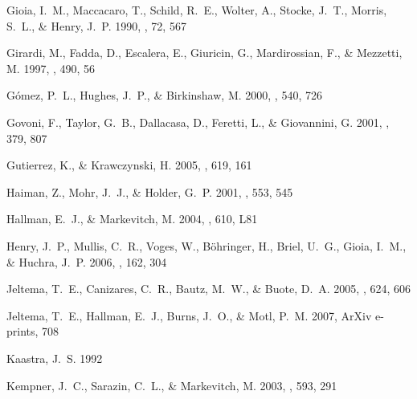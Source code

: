 \documentclass[12pt,preprint]{aastex}
\begin{document}
\begin{thebibliography}{}
{Gioia}, I.~M., {Maccacaro}, T., {Schild}, R.~E., {Wolter}, A., {Stocke},
  J.~T., {Morris}, S.~L., \& {Henry}, J.~P. 1990, \apjs, 72, 567

{Girardi}, M., {Fadda}, D., {Escalera}, E., {Giuricin}, G., {Mardirossian}, F.,
  \& {Mezzetti}, M. 1997, \apj, 490, 56

{G{\'o}mez}, P.~L., {Hughes}, J.~P., \& {Birkinshaw}, M. 2000, \apj, 540, 726

{Govoni}, F., {Taylor}, G.~B., {Dallacasa}, D., {Feretti}, L., \& {Giovannini},
  G. 2001, \aap, 379, 807

{Gutierrez}, K., \& {Krawczynski}, H. 2005, \apj, 619, 161

{Haiman}, Z., {Mohr}, J.~J., \& {Holder}, G.~P. 2001, \apj, 553, 545

{Hallman}, E.~J., \& {Markevitch}, M. 2004, \apjl, 610, L81

{Henry}, J.~P., {Mullis}, C.~R., {Voges}, W., {B{\"o}hringer}, H., {Briel},
  U.~G., {Gioia}, I.~M., \& {Huchra}, J.~P. 2006, \apjs, 162, 304

{Jeltema}, T.~E., {Canizares}, C.~R., {Bautz}, M.~W., \& {Buote}, D.~A. 2005,
  \apj, 624, 606

{Jeltema}, T.~E., {Hallman}, E.~J., {Burns}, J.~O., \& {Motl}, P.~M. 2007,
  ArXiv e-prints, 708

{Kaastra}, J.~S. 1992

{Kempner}, J.~C., {Sarazin}, C.~L., \& {Markevitch}, M. 2003, \apj, 593, 291


\end{thebibliography}
\end{document}
